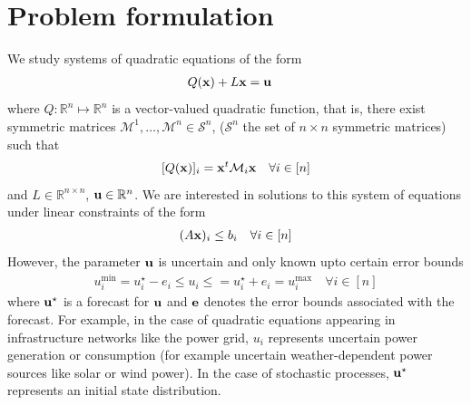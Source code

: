 \documentclass[11pt]{article}
\theoremstyle{plain}
\theoremstyle{definition}
\theoremstyle{remark}
\newcommand{\delete}[1]{\textcolor{red}{#1}}
\newcommand{\modified}[1]{\textcolor{darkgrn}{#1}}
\newcommand{\sym}[1]{\mathcal{S}^{#1}}
\begin{document}
\section{Problem formulation}


We study systems of quadratic equations of the form
\begin{align}
& Q(\bold x)+L\bold x=\bold u\label{eq:Quad}
\end{align}
where $Q: \mathbb{R}^n \mapsto \mathbb{R}^n$ is a vector-valued quadratic function, that is, there exist symmetric matrices $\mathcal{M}^1,\ldots,\mathcal{M}^{n} \in \sym{n}$, ($\sym{n}$ the set of $n \times n$ symmetric matrices) such that
\[[Q(\bold x)]_i = \bold x^t \mathcal{M}_{i} \bold x \quad \forall i \in [n]\]
and $L \in \mathbb{R}^{n\times n}$, $\bold u \in \mathbb{R}^n$. 
We are interested in solutions to this system of equations under linear constraints of the form
\begin{align}
(A\bold x)_i\leq b_i \quad \forall i \in [n]\label{eq:xLimits}
\end{align}
However, the parameter $\bold u$ is uncertain and only known upto certain error bounds
\begin{align}
u^{\min}_i=u_i^\star-e_i \leq u_i \leq =u_i^\star+e_i=u^{\max}_i \quad \forall i \in [n] \label{eq:uLimits}
\end{align}
where $\bold u^\star$ is a forecast for $\bold u$ and $\bold e$ denotes the error bounds associated with the forecast. 
For example, in the case of quadratic equations appearing in infrastructure networks like the power grid, $u_i$ represents uncertain power generation or consumption (for example uncertain weather-dependent power sources like solar or wind power). 
In the case of stochastic processes, $\bold u^\star$ represents an initial state distribution.
\end{document}
